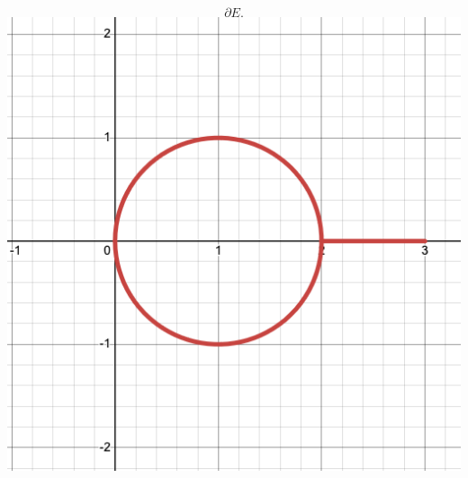 \documentclass{eeleyes}
\begin{document}
\begin{multicols}{3}
\columnbreak

\begin{center}
    \[
        \partial E
    .\]
    \includegraphics[width=0.8\linewidth]{figures/ii_img-3.png}
\end{center}
\end{multicols}
\end{document}
